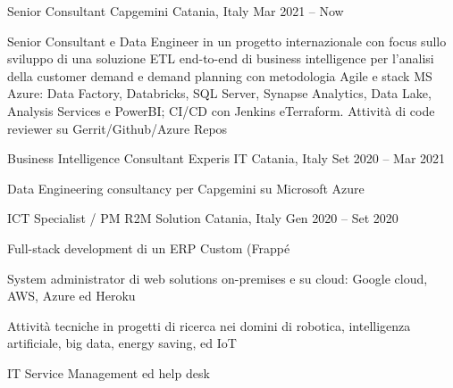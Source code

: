 
  \begin{cventries}
    \cventry
    {Senior Consultant}
    {Capgemini}    
    {Catania, Italy}
    {Mar 2021 -- Now}
    {
      \begin{cvitems}
        \item {Senior Consultant e Data Engineer in un progetto internazionale con focus sullo sviluppo di una soluzione ETL end-to-end di business intelligence per l'analisi della customer demand e demand planning con metodologia Agile e stack MS Azure: Data Factory, Databricks, SQL Server, Synapse Analytics, Data Lake, Analysis Services e PowerBI; CI/CD con Jenkins eTerraform. Attività di code reviewer su Gerrit/Github/Azure Repos}
      \end{cvitems}
    }

    \cventry
    {Business Intelligence Consultant}
    {Experis IT}    
    {Catania, Italy}
    {Set 2020 -- Mar 2021}
    {
      \begin{cvitems}
        \item {Data Engineering consultancy per Capgemini su Microsoft Azure}
      \end{cvitems}
    }

    \cventry
    {ICT Specialist / PM}
    {R2M Solution}    
    {Catania, Italy}
    {Gen 2020 -- Set 2020}
    {
      \begin{cvitems}
        \item {Full-stack development di un ERP Custom (Frappé}
        \item {System administrator di web solutions on-premises e su cloud: Google cloud, AWS, Azure ed Heroku}
        \item {Attività tecniche in progetti di ricerca nei domini di robotica, intelligenza artificiale, big data, energy saving, ed IoT}
        \item {IT Service Management ed help desk}
      \end{cvitems}
    }


\end{cventries}

